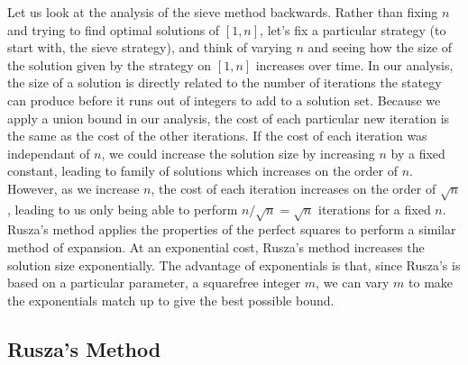 \documentclass{article}
\theoremstyle{plain}
\theoremstyle{plain}
\begin{document}
Let us look at the analysis of the sieve method backwards. Rather than fixing $n$ and trying to find optimal solutions of $[1,n]$, let's fix a particular strategy (to start with, the sieve strategy), and think of varying $n$ and seeing how the size of the solution given by the strategy on $[1,n]$ increases over time. In our analysis, the size of a solution is directly related to the number of iterations the stategy can produce before it runs out of integers to add to a solution set. Because we apply a union bound in our analysis, the cost of each particular new iteration is the same as the cost of the other iterations. If the cost of each iteration was independant of $n$, we could increase the solution size by increasing $n$ by a fixed constant, leading to family of solutions which increases on the order of $n$. However, as we increase $n$, the cost of each iteration increases on the order of $\sqrt{n}$, leading to us only being able to perform $n/\sqrt{n} = \sqrt{n}$ iterations for a fixed $n$. Rusza's method applies the properties of the perfect squares to perform a similar method of expansion. At an exponential cost, Rusza's method increases the solution size exponentially. The advantage of exponentials is that, since Rusza's is based on a particular parameter, a squarefree integer $m$, we can vary $m$ to make the exponentials match up to give the best possible bound.

\subsection{Rusza's Method}
\end{document}
